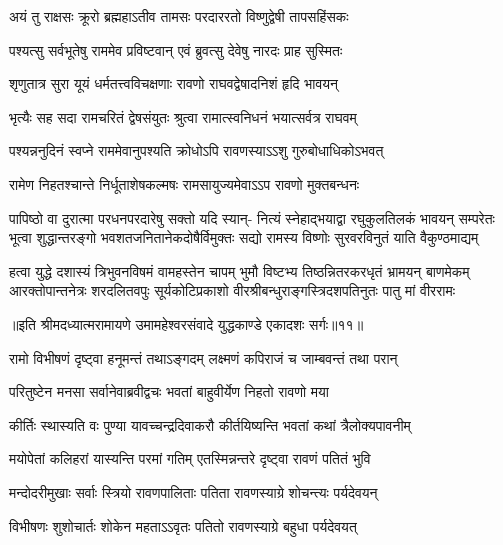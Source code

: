 \twolineshloka
{अयं तु राक्षसः क्रूरो ब्रह्महाऽतीव तामसः}
{परदाररतो विष्णुद्वेषी तापसहिंसकः} %

\twolineshloka
{पश्यत्सु सर्वभूतेषु राममेव प्रविष्टवान्}
{एवं ब्रुवत्सु देवेषु नारदः प्राह सुस्मितः} %

\twolineshloka
{शृणुतात्र सुरा यूयं धर्मतत्त्वविचक्षणाः}
{रावणो राघवद्वेषादनिशं हृदि भावयन्} %

\twolineshloka
{भृत्यैः सह सदा रामचरितं द्वेषसंयुतः}
{श्रुत्वा रामात्स्वनिधनं भयात्सर्वत्र राघवम्} %

\twolineshloka
{पश्यन्ननुदिनं स्वप्ने राममेवानुपश्यति}
{क्रोधोऽपि रावणस्याऽऽशु गुरुबोधाधिकोऽभवत्} %

\twolineshloka
{रामेण निहतश्चान्ते निर्धूताशेषकल्मषः}
{रामसायुज्यमेवाऽऽप रावणो मुक्तबन्धनः} %

\fourlineindentedshloka
{पापिष्ठो वा दुरात्मा परधनपरदारेषु सक्तो यदि स्यान्-}
{नित्यं स्नेहाद्भयाद्वा रघुकुलतिलकं भावयन् सम्परेतः}
{भूत्वा शुद्धान्तरङ्गो भवशतजनितानेकदोषैर्विमुक्तः}
{सद्यो रामस्य विष्णोः सुरवरविनुतं याति वैकुण्ठमाद्यम्} %

\fourlineindentedshloka
{हत्वा युद्धे दशास्यं त्रिभुवनविषमं वामहस्तेन चापम्}
{भुमौ विष्टभ्य तिष्ठन्नितरकरधृतं भ्रामयन् बाणमेकम्}
{आरक्तोपान्तनेत्रः शरदलितवपुः सूर्यकोटिप्रकाशो}
{वीरश्रीबन्धुराङ्गस्त्रिदशपतिनुतः पातु मां वीररामः} %

{॥इति श्रीमदध्यात्मरामायणे उमामहेश्वरसंवादे युद्धकाण्डे
एकादशः सर्गः॥११॥
}





\twolineshloka
{रामो विभीषणं दृष्ट्वा हनूमन्तं तथाऽङ्गदम्}
{लक्ष्मणं कपिराजं च जाम्बवन्तं तथा परान्} %

\twolineshloka
{परितुष्टेन मनसा सर्वानेवाब्रवीद्वचः}
{भवतां बाहुवीर्येण निहतो रावणो मया} %

\twolineshloka
{कीर्तिः स्थास्यति वः पुण्या यावच्चन्द्रदिवाकरौ}
{कीर्तयिष्यन्ति भवतां कथां त्रैलोक्यपावनीम्} %

\twolineshloka
{मयोपेतां कलिहरां यास्यन्ति परमां गतिम्}
{एतस्मिन्नन्तरे दृष्ट्वा रावणं पतितं भुवि} %

\twolineshloka
{मन्दोदरीमुखाः सर्वाः स्त्रियो रावणपालिताः}
{पतिता रावणस्याग्रे शोचन्त्यः पर्यदेवयन्} %

\twolineshloka
{विभीषणः शुशोचार्तः शोकेन महताऽऽवृतः}
{पतितो रावणस्याग्रे बहुधा पर्यदेवयत्} %

